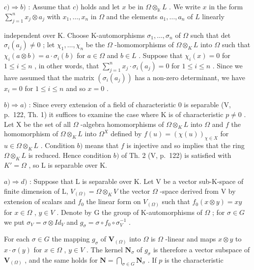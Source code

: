 \(c) \Rightarrow b)\) : Assume that \(c)\) holds and let \(x\) be in \(\Omega \otimes_{\mathbb{K}} L\) . We write \(x\) in the form \(\sum_{j=1}^{n} x_j \otimes a_j\) with \(x_1, \ldots, x_n\) in \(\Omega\) and the elements \(a_1, \ldots, a_n\) of \(L\) linearly

independent over K. Choose K-automorphisms \(\sigma_{1},\ldots,\sigma_{n}\) of \(\Omega\) such that det \(\sigma_{i}(a_{j})\neq0\) ; let \(\chi_{1},\ldots,\chi_{n}\) be the \(\Omega\) -homomorphisms of \(\Omega\otimes_{K}L\) into \(\Omega\) such that \(\chi_{i}(a\otimes b)=a\cdot\sigma_{i}(b)\) for \(a\in\Omega\) and \(b\in L\) . Suppose that \(\chi_{i}(x)=0\) for \(1\leqslant i\leqslant n\) , in other words, that \(\sum_{j=1}^{n}x_{j}\cdot\sigma_{i}(a_{j})=0\) for \(1\leqslant i\leqslant n\) . Since we have assumed that the matrix \((\sigma_{i}(a_{j}))\) has a non-zero determinant, we have \(x_{i}=0\) for \(1\leqslant i\leqslant n\) and so \(x=0\) .

\(b) \Rightarrow a)\) : Since every extension of a field of characteristic 0 is separable (V, p.~122, Th. 1) it suffices to examine the case where K is of characteristic \(p \neq 0\) . Let X be the set of all \(\Omega\) -algebra homomorphisms of \(\Omega \otimes_{K} L\) into \(\Omega\) and \(f\) the homomorphism of \(\Omega \otimes_{K} L\) into \(\Omega^{X}\) defined by \(f(u) = (\chi(u))_{\chi \in X}\) for \(u \in \Omega \otimes_{K} L\) . Condition \(b)\) means that \(f\) is injective and so implies that the ring \(\Omega \otimes_{K} L\) is reduced. Hence condition \(b)\) of Th. 2 (V, p.~122) is satisfied with \(K' = \Omega\) , so L is separable over K.

\(a) \Rightarrow d)\) : Suppose that L is separable over K. Let V be a vector sub-K-space of finite dimension of L, \(V_{(\Omega)} = \Omega \otimes_K V\) the vector \(\Omega\) -space derived from V by extension of scalars and \(f_0\) the linear form on \(V_{(\Omega)}\) such that \(f_0(x \otimes y) = xy\) for \(x \in \Omega\) , \(y \in V\) . Denote by G the group of K-automorphisms of \(\Omega\) ; for \(\sigma \in G\) we put \(\sigma_V = \sigma \otimes Id_V\) and \(g_\sigma = \sigma \circ f_0 \circ \sigma_V^{-1}\) .

For each \(\sigma \in G\) the mapping \(g_{\sigma}\) of \(\mathbf{V}_{(\Omega)}\) into \(\Omega\) is \(\Omega\) -linear and maps \(x \otimes y\) to \(x \cdot \sigma(y)\) for \(x \in \Omega\) , \(y \in V\) . The kernel \(\mathbf{N}_{\sigma}\) of \(g_{\sigma}\) is therefore a vector subspace of \(\mathbf{V}_{(\Omega)}\) , and the same holds for \(\mathbf{N} = \bigcap_{\sigma \in G} \mathbf{N}_{\sigma}\) . If \(p\) is the characteristic


